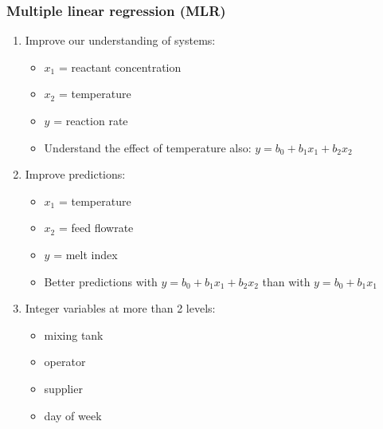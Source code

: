 \begin{frame}\frametitle{Multiple linear regression (MLR)}
	\begin{enumerate}
		\item	Improve our understanding of systems:
		\begin{itemize}
			\item	$x_1$ = reactant concentration
			\item	$x_2$ = temperature
			\item	$y$ = reaction rate
			\item	Understand the effect of temperature also: $y = b_0 + b_1x_1 + b_2x_2$
		\end{itemize}
		\item	Improve predictions:
		\begin{itemize}
			\item	$x_1$ = temperature
			\item	$x_2$ = feed flowrate
			\item	$y$ = melt index
			\item	Better predictions with $y = b_0 + b_1x_1 + b_2x_2$ than with $y = b_0 + b_1x_1$
		\end{itemize}
		\item	Integer variables at more than 2 levels:
		\begin{itemize}
			\item	mixing tank
			\item	operator
			\item	supplier
			\item	day of week
		\end{itemize}
	\end{enumerate}
\end{frame}

